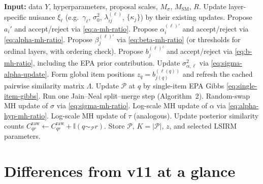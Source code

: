 \documentclass[11pt]{article}
\newcommand{\ind}{\mathbb I}
\begin{document}
\begin{algorithm}[H]
\caption{One full MCMC sweep (EPA--LSIRM).}
\small
\begin{algorithmic}[1]
\State \textbf{Input:} data $Y$, hyperparameters, proposal scales,
$M_\sigma$, $M_{\mathrm{SM}}$, $R$.
\State Update layer-specific nuisance $\xi_\ell$ (e.g.\ $\gamma_\ell$,
$\sigma_0^2$, $\lambda_{ij}^{(\ell)}$, $\{\kappa_j\}$) by their existing
updates.
    \State Propose $a_i'$ and accept/reject via \eqref{eq:a-mh-ratio}.
\EndFor
{}
        \State Propose $\alpha_i^{(\ell)\prime}$ and accept/reject via
        \eqref{eq:alpha-mh-ratio}.
    \EndFor
        \State Propose $\beta_j^{(\ell)\prime}$ via \eqref{eq:beta-mh-ratio}
        (or thresholds for ordinal layers, with ordering check).
        \State Propose $b_j^{(\ell)\prime}$ and accept/reject via
        \eqref{eq:b-mh-ratio}, including the EPA prior contribution.
    \EndFor
    \State Update $\sigma_{\alpha,\ell}^2$ via \eqref{eq:sigma-alpha-update}.
\EndFor
\State Form global item positions $z_q=b_{j(q)}^{(\ell(q))}$ and refresh
the cached pairwise similarity matrix $\Lambda$.
    \State Update $\mathcal{P}$ at $q$ by single-item EPA Gibbs
    \eqref{eq:single-item-gibbs}.
\EndFor
{}
    \State Run one Jain--Neal split--merge step (Algorithm~2).
\EndFor
{}
    \State Random-swap MH update of $\sigma$ via \eqref{eq:sigma-mh-ratio}.
\EndFor
\State Log-scale MH update of $\alpha$ via \eqref{eq:alpha-hyp-mh-ratio}.
\State Log-scale MH update of $\tau$ (analogous).
    \State Update posterior similarity counts
    $C_{qr}^{\mathrm{raw}}\leftarrow C_{qr}^{\mathrm{raw}}+\ind(q\sim_{\mathcal{P}}r)$.
    \State Store $\mathcal{P}$, $K=|\mathcal{P}|$, $z$, and selected LSIRM
    parameters.
\EndIf
\end{algorithmic}
\end{algorithm}

\section{Differences from v11 at a glance}
\end{document}
